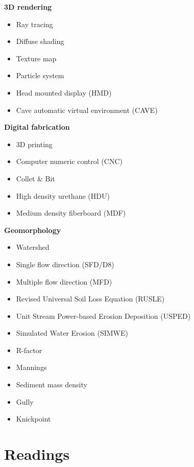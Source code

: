 \documentclass[11pt,article,oneside]{memoir}
\begin{document}
\begin{multicols}{2}
\textbf{3D rendering}
\begin{itemize}
\item Ray tracing
\item Diffuse shading
\item Texture map
\item Particle system
\item Head mounted display (HMD)
\item Cave automatic virtual environment (CAVE)
\end{itemize}

\textbf{Digital fabrication}
\begin{itemize}
\item 3D printing
\item Computer numeric control (CNC)
\item Collet \& Bit
\item High density urethane (HDU)
\item Medium density fiberboard (MDF)
\end{itemize}

\textbf{Geomorphology}
\begin{itemize}
\item Watershed
\item Single flow direction (SFD/D8)
\item Multiple flow direction (MFD)
\item Revised Universal Soil Loss Equation (RUSLE)
\item Unit Stream Power-based Erosion Deposition (USPED)
\item Simulated Water Erosion (SIMWE)
\item R-factor
\item Mannings
\item Sediment mass density
\item Gully
\item Knickpoint
\end{itemize}
%
\end{multicols}

\clearpage

\section{Readings}
\vspace*{0.5cm}
\nocite{*}
\setlength{}
\printbibliography[heading=none]
\clearpage
\end{document}
